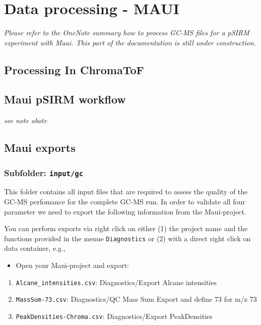 \documentclass[]{book}
\providecommand{\tightlist}{%
  \setlength{\itemsep}{0pt}\setlength{\parskip}{0pt}}
\theoremstyle{definition}
\theoremstyle{definition}
\theoremstyle{definition}
\theoremstyle{remark}
\begin{document}

\chapter{Data processing - MAUI}\label{mauiproc}

\emph{Please refer to the OneNote summary how to process GC-MS files for
a pSIRM experiment with Maui. This part of the documentation is still
under construction.}

\section{Processing In ChromaToF}\label{processing-in-chromatof}

\section{Maui pSIRM workflow}\label{mauipsirm}

\emph{see note abote}

\section{Maui exports}\label{mauiexport}

\subsection{\texorpdfstring{Subfolder:
\texttt{input/gc}}{Subfolder: input/gc}}\label{subfolder-inputgc}

This folder contains all input files that are required to assess the
quality of the GC-MS perfomance for the complete GC-MS run. In order to
validate all four parameter we need to export the following information
from the Maui-project.

You can perform exports via right click on either (1) the project name
and the functions provided in the menue \texttt{Diagnostics} or (2) with
a direct right click on data container, e.g.,

\begin{itemize}
\tightlist
\item
  Open your Maui-project and export:
\end{itemize}

\begin{enumerate}
\def\labelenumi{\arabic{enumi}.}
\tightlist
\item
  \texttt{Alcane\_intensities.csv}: Diagnostics/Export Alcane
  intensities
\item
  \texttt{MassSum-73.csv}: Diagnostics/QC Mass Sum Export and define 73
  for m/z 73
\item
  \texttt{PeakDensities-Chroma.csv}: Diagnostics/Export PeakDensities
\end{enumerate}
\end{document}
